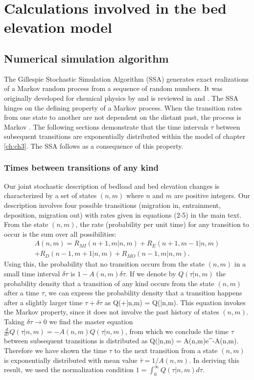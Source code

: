 

\chapter{Calculations involved in the bed elevation model}
\label{ch:gill}
\section{Numerical simulation algorithm}

The Gillespie Stochastic Simulation Algorithm (SSA) generates exact realizations of a Markov random process from a sequence of random numbers.
It was originally developed for chemical physics by \citet{Gillespie1977} and is reviewed in \citet{Gillespie1991} and \citet{Gillespie2007}.
The SSA hinges on the defining property of a Markov process. When the transition rates from one state to another are not dependent on the distant past, the process is Markov \citep[e.g.,][]{Cox1965}.
The following sections demonstrate that the time intervals $\tau$ between subsequent transitions are exponentially distributed within the model of chapter \ref{ch:ch3}. The SSA follows as a consequence of this property.

\subsection{Times between transitions of any kind}
Our joint stochastic description of bedload and bed elevation changes is characterized by a set of states $(n,m)$ where $n$ and $m$ are positive integers. 
Our description involves four possible transitions (migration in, entrainment, deposition, migration out) with rates given in equations (2-5) in the main text.
From the state $(n,m)$, the rate (probability per unit time) for any transition to occur is the sum over all possibilities:
\begin{multline} A(n,m) = R_{MI}(n+1,m|n,m) + R_E(n+1,m-1|n,m) \\+ R_D(n-1,m+1|n,m) + R_{MO}(n-1,m|n,m).\end{multline}
Using this, the probability that no transition occurs from the state $(n,m)$ in a small time interval $\delta \tau$ is $1-A(n,m)\delta \tau$. If we denote by $Q(\tau|n,m)$ the probability density that a transition of any kind occurs from the state $(n,m)$ after a time $\tau$, we can express the probability density that a transition happens after a slightly larger time $\tau + \delta \tau$ as 
\be Q(\tau+\delta \tau|n,m) = Q(\tau|n,m).\ee
This equation invokes the Markov property, since it does not involve the past history of states $(n,m)$. Taking $\delta\tau \rightarrow 0 $ we find the master equation $\frac{d}{d\tau}Q(\tau|n,m) = -A(n,m)Q(\tau|n,m)$, from which we conclude the time $\tau$ between subsequent transitions is distributed as 
\be Q(\tau|n,m) = A(n,m)e^{-A(n,m)\tau}. \label{eq:exp}\ee
Therefore we have shown the time $\tau$ to the next transition from a state $(n,m)$ is exponentially distributed with mean value $\bar{\tau} = 1/A(n,m).$ In deriving this result, we used the normalization condition $1 = \int_0^\infty Q(\tau|n,m)d\tau.$

